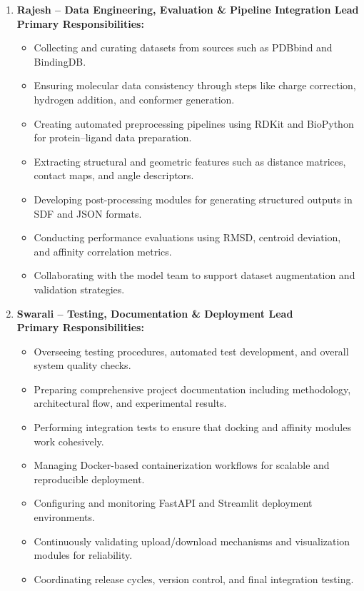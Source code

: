 \documentclass[12pt,a4]{report}
\begin{document}
\begin{enumerate}
  \vspace{0.2cm}

  \item \textbf{Rajesh – Data Engineering, Evaluation \& Pipeline Integration Lead}\\

  \textbf{Primary Responsibilities:}
  \begin{itemize}
    \item Collecting and curating datasets from sources such as PDBbind and BindingDB.
    \item Ensuring molecular data consistency through steps like charge correction, hydrogen addition, and conformer generation.
    \item Creating automated preprocessing pipelines using RDKit and BioPython for protein–ligand data preparation.
    \item Extracting structural and geometric features such as distance matrices, contact maps, and angle descriptors.
    \item Developing post-processing modules for generating structured outputs in SDF and JSON formats.
    \item Conducting performance evaluations using RMSD, centroid deviation, and affinity correlation metrics.
   
    \item Collaborating with the model team to support dataset augmentation and validation strategies.\\
  \end{itemize}

  \vspace{0.2cm}

  \item \textbf{Swarali – Testing, Documentation \& Deployment Lead}\\

  \textbf{Primary Responsibilities:}
  \begin{itemize}
    \item Overseeing testing procedures, automated test development, and overall system quality checks.
    \item Preparing comprehensive project documentation including methodology, architectural flow, and experimental results.
    \item Performing integration tests to ensure that docking and affinity modules work cohesively.
    \item Managing Docker-based containerization workflows for scalable and reproducible deployment.
    \item Configuring and monitoring FastAPI and Streamlit deployment environments.
    \item Continuously validating upload/download mechanisms and visualization modules for reliability.
    \item Coordinating release cycles, version control, and final integration testing.\\
  \end{itemize}

\end{enumerate}
\end{document}
